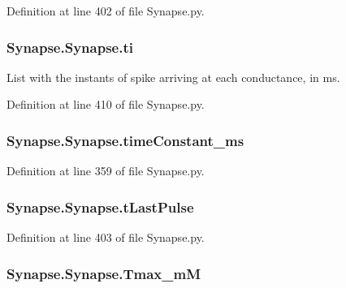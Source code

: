 Definition at line 402 of file Synapse.\+py.

\subsubsection[{\texorpdfstring{ti}{ti}}]{\setlength{\rightskip}{0pt plus 5cm}Synapse.\+Synapse.\+ti}\hypertarget{class_synapse_1_1_synapse_a714c95723607acad52af96ad55b6c575}{}\label{class_synapse_1_1_synapse_a714c95723607acad52af96ad55b6c575}


List with the instants of spike arriving at each conductance, in ms. 



Definition at line 410 of file Synapse.\+py.

\subsubsection[{\texorpdfstring{time\+Constant\+\_\+ms}{timeConstant_ms}}]{\setlength{\rightskip}{0pt plus 5cm}Synapse.\+Synapse.\+time\+Constant\+\_\+ms}\hypertarget{class_synapse_1_1_synapse_a875adea3ef112a9750532b5e21d47e93}{}\label{class_synapse_1_1_synapse_a875adea3ef112a9750532b5e21d47e93}


Definition at line 359 of file Synapse.\+py.

\subsubsection[{\texorpdfstring{t\+Last\+Pulse}{tLastPulse}}]{\setlength{\rightskip}{0pt plus 5cm}Synapse.\+Synapse.\+t\+Last\+Pulse}\hypertarget{class_synapse_1_1_synapse_a7df1cc4e7b014e7286b0bbb99079abcf}{}\label{class_synapse_1_1_synapse_a7df1cc4e7b014e7286b0bbb99079abcf}


Definition at line 403 of file Synapse.\+py.

\subsubsection[{\texorpdfstring{Tmax\+\_\+mM}{Tmax_mM}}]{\setlength{\rightskip}{0pt plus 5cm}Synapse.\+Synapse.\+Tmax\+\_\+mM}\hypertarget{class_synapse_1_1_synapse_ae4bcd698c5be77c2a6629d511d75f046}{}\label{class_synapse_1_1_synapse_ae4bcd698c5be77c2a6629d511d75f046}


